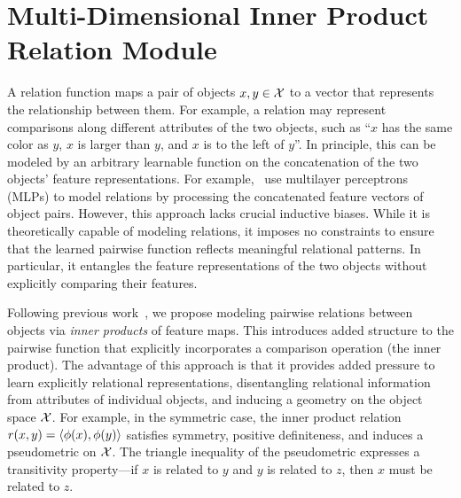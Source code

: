 \section{Multi-Dimensional Inner Product Relation Module}\label{sec:mdipr}

A relation function maps a pair of objects $x, y \in {\mathcal{X}}$ to a vector that represents the relationship between them. For example, a relation may represent comparisons along different attributes of the two objects, such as ``$x$ has the same color as $y$, $x$ is larger than $y$, and $x$ is to the left of $y$''. In principle, this can be modeled by an arbitrary learnable function on the concatenation of the two objects' feature representations. For example,~\citet{santoroSimpleNeural2017} use multilayer perceptrons (MLPs) to model relations by processing the concatenated feature vectors of object pairs. However, this approach lacks crucial inductive biases. While it is theoretically capable of modeling relations,  it imposes no constraints to ensure that the learned pairwise function reflects meaningful relational patterns. In particular, it entangles the feature representations of the two objects without explicitly comparing their features.

Following previous work~\citep[e.g.,][]{webbEmergentSymbols2021, kergNeuralArchitecture2022, altabaaAbstractorsRelationalCrossattention2024}, we propose modeling pairwise relations between objects via \textit{inner products} of feature maps. This introduces added structure to the pairwise function that explicitly incorporates a comparison operation (the inner product).
The advantage of this approach is that it provides added pressure to learn explicitly relational representations, disentangling relational information from attributes of individual objects, and inducing a geometry on the object space ${\mathcal{X}}$.
For example, in the symmetric case, the inner product relation $r(x,y) = \left \langle \phi(x), \phi(y) \right\rangle$ satisfies symmetry, positive definiteness, and induces a pseudometric on ${\mathcal{X}}$. The triangle inequality of the pseudometric expresses a transitivity property---if $x$ is related to $y$ and $y$ is related to $z$, then $x$ must be related to $z$.


